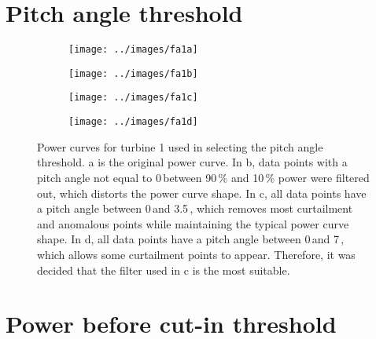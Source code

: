 \chapter{Pitch angle threshold}\label{a1}

\begin{figure}
  \centering
  \begin{subfigure}[t]{.5\textwidth}
    \centering
    \texttt{[image: ../images/fa1a]}
    \caption{}
  \end{subfigure}
  \begin{subfigure}[t]{.5\textwidth}
    \centering
    \texttt{[image: ../images/fa1b]}
    \caption{}
  \end{subfigure}
  \begin{subfigure}[t]{.49\textwidth}
    \centering
    \texttt{[image: ../images/fa1c]}
    \caption{}
  \end{subfigure}
  \begin{subfigure}[t]{.49\textwidth}
    \centering
    \texttt{[image: ../images/fa1d]}
    \caption{}
  \end{subfigure}
  \captionsetup{labelformat=empty,list=no}
  \caption{Power curves for turbine 1 used in selecting the pitch angle threshold. a is the original power curve. In b, data points with a pitch angle not equal to 0\,\textdegree between 90\,\% and 10\,\% power were filtered out, which distorts the power curve shape. In c, all data points have a pitch angle between 0\,\textdegree and 3.5\,\textdegree, which removes most curtailment and anomalous points while maintaining the typical power curve shape. In d, all data points have a pitch angle between 0\,\textdegree and 7\,\textdegree, which allows some curtailment points to appear. Therefore, it was decided that the filter used in c is the most suitable.}
\end{figure}

\chapter{Power before cut-in threshold}\label{a2}

